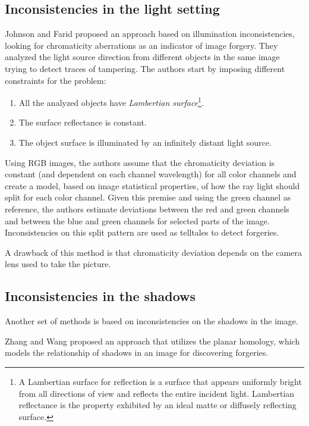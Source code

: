 \subsection{Inconsistencies in the light setting}

Johnson and Farid\cite{Johnson:2005:EDF:1073170.1073171} proposed an approach based on illumination inconsistencies, looking for chromaticity aberrations as an indicator of image forgery. They analyzed the light source direction from different objects in the same image trying to detect traces of tampering. The authors start by imposing different constraints for the problem:

\begin{enumerate}
\item All the analyzed objects have \emph{Lambertian surface}\footnote{A Lambertian surface for reflection is a surface that appears uniformly bright from all directions of view and reflects the entire incident light. Lambertian reflectance is the property exhibited by an ideal matte or diffusely reflecting surface.}.
\item The surface reflectance is constant.
\item The object surface is illuminated by an infinitely distant light source.
\end{enumerate}

Using RGB images, the authors assume that the chromaticity deviation is constant (and dependent on each channel wavelength) for all color channels and create a model, based on image statistical properties, of how the ray light should split for each color channel. Given this premise and using the green channel as reference, the authors estimate deviations between the red and green channels and between the blue and green channels for selected parts of the image. Inconsistencies on this split pattern are used as telltales to detect forgeries. 

A drawback of this method is that chromaticity deviation depends on the camera lens used to take the picture. 

\subsection{Inconsistencies in the shadows}

Another set of methods is based on inconsistencies on the shadows in the image.
 
Zhang and Wang \cite{zhang2009detecting} proposed an approach that utilizes the planar homology\cite{springer1964geometry}, which models the relationship of shadows in an image for discovering forgeries.

